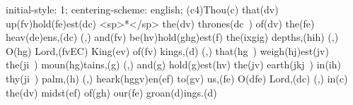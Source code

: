initial-style: 1;
centering-scheme: english;
(c4)Thou(c) that(dv) up(fv)hold(fe)est(dc) <sp>*</sp> the(dv) thrones(dc~) of(dv) the(fe) heav(de)ens,(dc) (,) and(fv) be(hv)hold(ghg)est(f) the(ixgig) depths,(hih) (,) O(hg) Lord,(fvEC) King(ev) of(fv) kings,(d) (,) that(hg~) weigh(hj)est(jv) the(ji~) moun(hg)tains,(g) (,) and(g) hold(g)est(hv) the(jv) earth(jkj~) in(ih) thy(ji~) palm,(h) (,) heark(hggv)en(ef) to(gv) us,(fe) O(dfe) Lord,(dc) (,) in(c) the(dv) midst(ef) of(gh) our(fe) groan(d)ings.(d)
